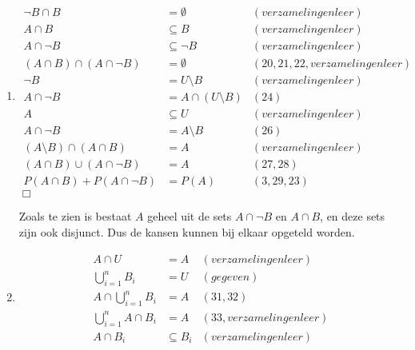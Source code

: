 \documentclass{article}
\begin{document}
\begin{enumerate}
\begin{enumerate}
            \item
                \begin{align}
                    \lnot B \cap B &= \emptyset & (verzamelingenleer)\\
                    A\cap B &\subseteq B & (verzamelingenleer)\\
                    A\cap \lnot B &\subseteq \lnot B & (verzamelingenleer)\\
                    (A\cap B) \cap (A \cap \lnot B) &= \emptyset  &(20, 21, 22,
                    verzamelingenleer)\\
                    \lnot B &= U\setminus B & (verzamelingenleer)\\
                    A\cap \lnot B &= A \cap (U\setminus B) & (24)\\
                    A &\subseteq U & (verzamelingenleer)\\
                    A\cap \lnot B &= A \setminus B & (26)\\
                    (A\setminus B) \cap (A\cap B) &= A & (verzamelingenleer)\\
                    (A\cap B) \cup (A \cap \lnot B) &=A & (27, 28)\\
                    P(A\cap B) + P(A \cap \lnot B) &= P(A) & (3, 29, 23)
                \end{align}
                $\Box$

                Zoals te zien is bestaat $A$ geheel uit de sets $A\cap\lnot B$
                en $A\cap B$, en deze sets zijn ook disjunct. Dus de kansen
                kunnen bij elkaar opgeteld worden.

            \item
                \begin{align}
                    A \cap U &= A & (verzamelingenleer)\\
                    \bigcup_{i=1}^n B_i &= U & (gegeven)\\
                    A \cap \bigcup_{i=1}^n B_i &= A & (31, 32)\\
                    \bigcup_{i=1}^n A \cap B_i &= A & (33, verzamelingenleer)\\
                    A \cap B_i &\subseteq B_i & (verzamelingenleer)
                \end{align}


\end{enumerate}
\end{enumerate}
\end{document}
